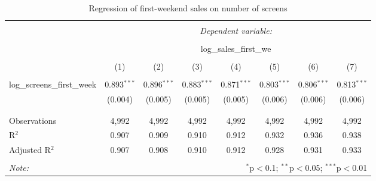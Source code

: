 
\begin{table}[!htbp] \centering 
  \caption{Regression of first-weekend sales on number of screens} 
  \label{} 
\begin{tabular}{@{\extracolsep{5pt}}lccccccc} 
\\[-1.8ex]\hline 
\hline \\[-1.8ex] 
 & \multicolumn{7}{c}{\textit{Dependent variable:}} \\ 
\cline{2-8} 
\\[-1.8ex] & \multicolumn{7}{c}{log\_sales\_first\_we} \\ 
\\[-1.8ex] & (1) & (2) & (3) & (4) & (5) & (6) & (7)\\ 
\hline \\[-1.8ex] 
 log\_screens\_first\_week & 0.893$^{***}$ & 0.896$^{***}$ & 0.883$^{***}$ & 0.871$^{***}$ & 0.803$^{***}$ & 0.806$^{***}$ & 0.813$^{***}$ \\ 
  & (0.004) & (0.005) & (0.005) & (0.005) & (0.006) & (0.006) & (0.006) \\ 
  & & & & & & & \\ 
\hline \\[-1.8ex] 
Observations & 4,992 & 4,992 & 4,992 & 4,992 & 4,992 & 4,992 & 4,992 \\ 
R$^{2}$ & 0.907 & 0.909 & 0.910 & 0.912 & 0.932 & 0.936 & 0.938 \\ 
Adjusted R$^{2}$ & 0.907 & 0.908 & 0.910 & 0.912 & 0.928 & 0.931 & 0.933 \\ 
\hline 
\hline \\[-1.8ex] 
\textit{Note:}  & \multicolumn{7}{r}{$^{*}$p$<$0.1; $^{**}$p$<$0.05; $^{***}$p$<$0.01} \\ 
\end{tabular} 
\end{table} 
